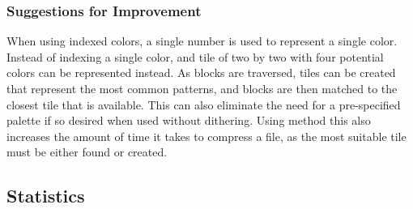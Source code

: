\documentclass[12pt]{CPP}
\begin{document}
\subsubsection{Suggestions for Improvement}
When using indexed colors, a single number is used to represent a single color. Instead of indexing a single color, and tile of two by two with four potential colors can be represented instead. As blocks are traversed, tiles can be created that represent the most common patterns, and blocks are then matched to the closest tile that is available. This can also eliminate the need for a pre-specified palette if so desired when used without dithering. Using method this also increases the amount of time it takes to compress a file, as the most suitable tile must be either found or created. 

\newpage

\subsection{Statistics}
\end{document}
